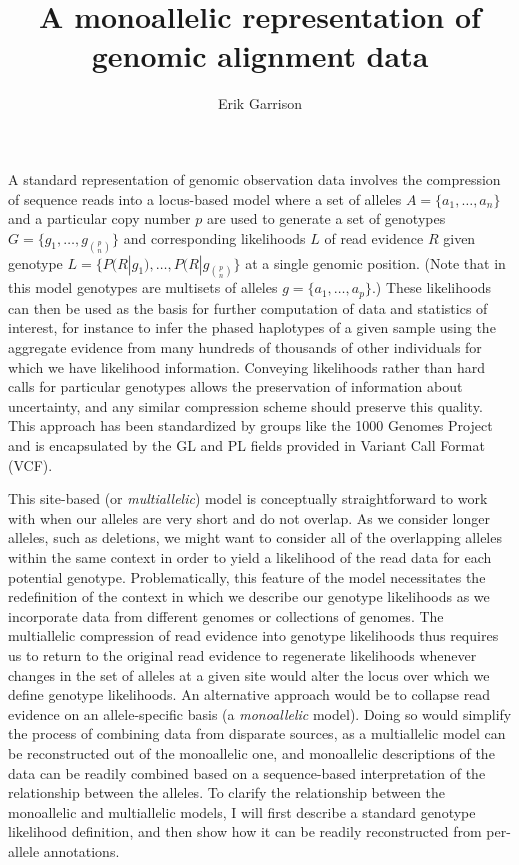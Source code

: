 \documentclass{article}
\begin{document}
\title{A monoallelic representation of genomic alignment data}

\author{Erik Garrison}

\maketitle

A standard representation of genomic observation data involves the compression of sequence reads into a locus-based model where a set of alleles $A = \{ a_1, \ldots, a_n \}$ and a particular copy number $p$ are used to generate a set of genotypes $G = \{ g_1, \ldots, g_{p \choose n} \}$ and corresponding likelihoods $L$ of read evidence $R$ given genotype $L = \{ P(R|g_1), \ldots, P(R|g_{p \choose n} \}$ at a single genomic position. (Note that in this model genotypes are multisets of alleles $g = \{ a_1, \dots, a_p \}$.) These likelihoods can then be used as the basis for further computation of data and statistics of interest, for instance to infer the phased haplotypes of a given sample using the aggregate evidence from many hundreds of thousands of other individuals for which we have likelihood information. Conveying likelihoods rather than hard calls for particular genotypes allows the preservation of information about uncertainty, and any similar compression scheme should preserve this quality. This approach has been standardized by groups like the 1000 Genomes Project and is encapsulated by the GL and PL fields provided in Variant Call Format (VCF).

This site-based (or \emph{multiallelic}) model is conceptually straightforward to work with when our alleles are very short and do not overlap. As we consider longer alleles, such as deletions, we might want to consider all of the overlapping alleles within the same context in order to yield a likelihood of the read data for each potential genotype. Problematically, this feature of the model necessitates the redefinition of the context in which we describe our genotype likelihoods as we incorporate data from different genomes or collections of genomes. The multiallelic compression of read evidence into genotype likelihoods thus requires us to return to the original read evidence to regenerate likelihoods whenever changes in the set of alleles at a given site would alter the locus over which we define genotype likelihoods. An alternative approach would be to collapse read evidence on an allele-specific basis (a \emph{monoallelic} model). Doing so would simplify the process of combining data from disparate sources, as a multiallelic model can be reconstructed out of the monoallelic one, and monoallelic descriptions of the data can be readily combined based on a sequence-based interpretation of the relationship between the alleles. To clarify the relationship between the monoallelic and multiallelic models, I will first describe a standard genotype likelihood definition, and then show how it can be readily reconstructed from per-allele annotations.
\end{document}
